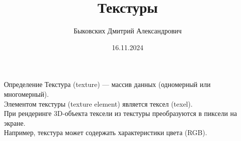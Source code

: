 \documentclass{beamer}
\title[Textures]{Текстуры}
\author[Быковских Д.А.]{Быковских Дмитрий Александрович}
\date{16.11.2024}
\begin{document}
	\begin{frame}
		\titlepage
	\end{frame}




	\begin{frame}{Определение}
		Текстура (texture) --- массив данных (одномерный или многомерный).\\
		Элементом текстуры (texture element) является тексел (texel).\\
		
		При рендеринге 3D-объекта тексели из текстуры преобразуются в пиксели на экране.\\
		Например, текстура может содержать характеристики цвета (RGB).\\
				



	\end{frame}
\end{document}
